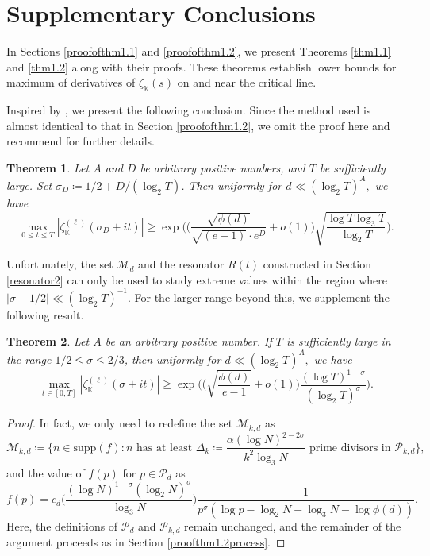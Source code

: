 \documentclass[12pt,reqno]{amsart}
\newtheorem{thm}{Theorem}[section]
\theoremstyle{definition}
\numberwithin{equation}{section}
\newcommand{\inv}{^{-1}}
\newcommand{\mbk}{\mathbb{K}}
\newcommand{\mcp}{\mathcal{P}}
\newcommand{\mcm}{\mathcal{M}}
\begin{document}
\section{Supplementary Conclusions}
\label{supplementaryconclusions}
In Sections \ref{proofofthm1.1} and \ref{proofofthm1.2}, we present Theorems \ref{thm1.1} and \ref{thm1.2} along with their proofs. These theorems establish lower bounds for maximum of derivatives of $\zeta_\mbk(s)$ on and near the critical line.
\par
Inspired by \cite{dong2023Onde}, we present the following conclusion. Since the method used is almost identical to that in Section \ref{proofofthm1.2}, we omit the proof here and recommend \cite{dong2025largevalue} for further details.
\begin{thm}
    \label{thm5.1}
    Let $A$ and $D$ be arbitrary positive numbers, and $T$ be sufficiently large. Set $\sigma_D \coloneqq 1/2 + D/(\log_2 T)$. Then uniformly for $d \ll (\log_2T)^A,$ we have
    $$
    \max_{0\le t\le T}|\zeta^{(\ell)}_\mbk(\sigma_D+it)| \ge \exp\bigg(\Big(\frac{\sqrt{\phi(d)}}{\sqrt{(e-1)}\cdot e^D} + o(1)\Big)\sqrt{\frac{\log T\log_3 T}{\log_2 T}}\bigg).
    $$   
\end{thm}
Unfortunately, the set $\mcm_d$ and the resonator $R(t)$ constructed in Section \ref{resonator2} can only be used to study extreme values within the region where $|\sigma-1/2| \ll (\log_2T)\inv$. For the larger range beyond this, we supplement the following result.
\begin{thm}
     \label{thm5.2}
     Let $A$ be an arbitrary positive number. If $T$ is sufficiently large in the range $1/2 \le \sigma \le 2/3$, then uniformly for $d \ll (\log_2T)^A,$ we have
$$
    \max_{t\in[0,T]}|\zeta_\mbk^{(\ell)}(\sigma+it)|\ge \exp\bigg(\Big(\sqrt{\frac{\phi(d)}{e-1}}+o(1)\Big)\frac{(\log T)^{1-\sigma}}{(\log_2 T)^{\sigma}}\bigg).
$$
\end{thm}
\begin{proof}
In fact, we only need to redefine the set $\mcm_{k,d}$ as
$$\mcm_{k,d} \coloneqq \bigg\{ n \in \mathrm{supp}(f) : n \text{ has at least } \Delta_k \coloneqq \frac{\alpha (\log N)^{2 - 2\sigma}}{k^2 \log_3 N} \text{ prime divisors in } \mcp_{k,d} \bigg\},
$$
and the value of $f(p)$ for $p \in \mcp_d$ as 
$$
f(p) = c_d \bigg( \frac{(\log N)^{1 - \sigma} (\log_2 N)^{\sigma}}{\log_3 N} \bigg) \frac{1}{p^{\sigma} (\log p - \log_2 N - \log_3 N - \log \phi(d))}.
$$
Here, the definitions of $\mcp_d$ and $\mcp_{k,d}$ remain unchanged, and the remainder of the argument proceeds as in Section \ref{proofthm1.2process}.
\end{proof}
\end{document}
